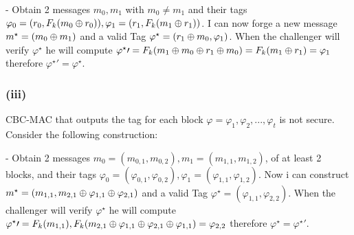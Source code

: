 \documentclass[11pt]{article}
\newcounter{t0d0_counter}
\begin{document}
- Obtain 2 messages $m_0, m_1$ with $m_0\neq m_1$ and their tags $\varphi_0=(r_0,F_k(m_0\oplus r_0)), \varphi_1=(r_1,F_k(m_1\oplus r_1))$.
I can now forge a new message $m^\star=(m_0\oplus m_1)$ and a valid Tag $\varphi^\star=(r_1\oplus m_0, \varphi_1)$.
When the challenger will verify $\varphi^\star$ he will compute
$\varphi^\star\prime=F_k(m_1\oplus m_0\oplus r_1\oplus m_0)=F_k(m_1\oplus r_1)=\varphi_1$
therefore $\varphi^\star\prime=\varphi^\star$.

\subsubsection{(iii)}
CBC-MAC that outputs the tag for each block $\varphi=\varphi_1,\varphi_2,...,\varphi_t$ is not secure. Consider the following construction:

- Obtain 2 messages $m_0=(m_{0,1},m_{0,2}), m_1=(m_{1,1},m_{1,2})$, of at least 2 blocks, and their tags 
$\varphi_0=(\varphi_{0,1},\varphi_{0,2}), \varphi_1=(\varphi_{1,1},\varphi_{1,2})$. Now i can construct 
$m^\star=(m_{1,1}, m_{2,1}\oplus\varphi_{1,1}\oplus\varphi_{2,1})$ and a valid Tag 
$\varphi^\star=(\varphi_{1,1}, \varphi_{2,2})$. When the challenger will verify $\varphi^\star$ he will compute
$\varphi^\star\prime=F_k(m_{1,1}),F_k(m_{2,1}\oplus\varphi_{1,1}\oplus\varphi_{2,1}\oplus\varphi_{1,1})=\varphi_{2,2}$
therefore $\varphi^\star=\varphi^\star\prime$.
\end{document}
